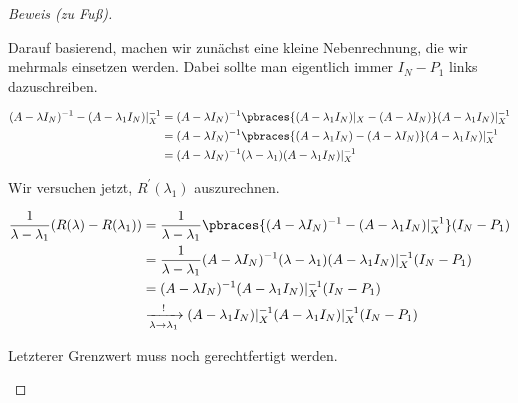 \begin{proof}[Beweis (zu Fuß)]
\begin{enumerate}[label = (\roman*)]
        Darauf basierend, machen wir zunächst eine kleine Nebenrechnung, die wir mehrmals einsetzen werden.
        Dabei sollte man eigentlich immer $I_N - P_1$ links dazuschreiben.

        \begin{align*}
            (A - \lambda I_N)^{-1}
            -
            (A - \lambda_1 I_N) |_X^{-1}
            & =
            (A - \lambda I_N)^{-1}
            \pbraces
            {
                (A - \lambda_1 I_N) |_X
                -
                (A - \lambda I_N)
            }
            (A - \lambda_1 I_N) |_X^{-1} \\
            & =
            (A - \lambda I_N)^{-1}
            \pbraces
            {
                (A - \lambda_1 I_N)
                -
                (A - \lambda I_N)
            }
            (A - \lambda_1 I_N) |_X^{-1} \\
            & =
            (A - \lambda I_N)^{-1}
            (\lambda - \lambda_1)
            (A - \lambda_1 I_N) |_X^{-1}
        \end{align*}

        Wir versuchen jetzt, $R^\prime(\lambda_1)$ auszurechnen.

        \begin{align*}
            \frac{1}{\lambda - \lambda_1}
            (R(\lambda) - R(\lambda_1))
            & =
            \frac{1}{\lambda - \lambda_1}
            \pbraces
            {
                (A - \lambda I_N)^{-1}
                -
                (A - \lambda_1 I_N) |_X^{-1}
            }
            (I_N - P_1) \\
            & =
            \frac{1}{\lambda - \lambda_1}
            (A - \lambda I_N)^{-1}
            (\lambda - \lambda_1)
            (A - \lambda_1 I_N) |_X^{-1}
            (I_N - P_1) \\
            & =
            (A - \lambda I_N)^{-1}
            (A - \lambda_1 I_N) |_X^{-1}
            (I_N - P_1) \\
            & \xrightarrow[\lambda \to \lambda_1]{!}
            (A - \lambda_1 I_N) |_X^{-1}
            (A - \lambda_1 I_N) |_X^{-1}
            (I_N - P_1)
        \end{align*}

        Letzterer Grenzwert muss noch gerechtfertigt werden.


\end{enumerate}
\end{proof}
